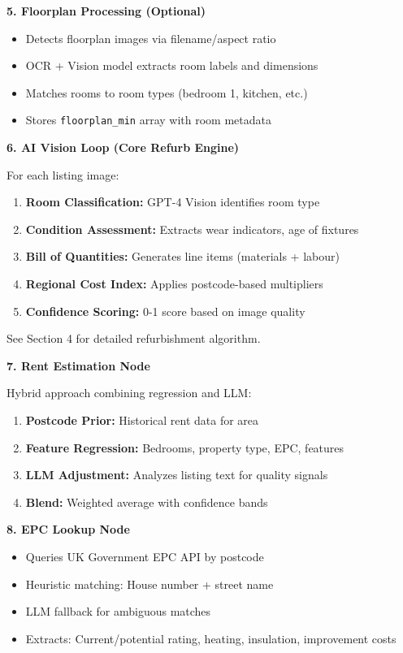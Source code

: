 \documentclass[11pt,a4paper]{article}
\begin{document}
\textbf{5. Floorplan Processing (Optional)}
\begin{itemize}
  \item Detects floorplan images via filename/aspect ratio
  \item OCR + Vision model extracts room labels and dimensions
  \item Matches rooms to room types (bedroom 1, kitchen, etc.)
  \item Stores \texttt{floorplan\_min} array with room metadata
\end{itemize}

\textbf{6. AI Vision Loop (Core Refurb Engine)}

For each listing image:
\begin{enumerate}
  \item \textbf{Room Classification:} GPT-4 Vision identifies room type
  \item \textbf{Condition Assessment:} Extracts wear indicators, age of fixtures
  \item \textbf{Bill of Quantities:} Generates line items (materials + labour)
  \item \textbf{Regional Cost Index:} Applies postcode-based multipliers
  \item \textbf{Confidence Scoring:} 0-1 score based on image quality
\end{enumerate}

See Section 4 for detailed refurbishment algorithm.

\textbf{7. Rent Estimation Node}

Hybrid approach combining regression and LLM:

\begin{enumerate}
  \item \textbf{Postcode Prior:} Historical rent data for area
  \item \textbf{Feature Regression:} Bedrooms, property type, EPC, features
  \item \textbf{LLM Adjustment:} Analyzes listing text for quality signals
  \item \textbf{Blend:} Weighted average with confidence bands
\end{enumerate}

\textbf{8. EPC Lookup Node}
\begin{itemize}
  \item Queries UK Government EPC API by postcode
  \item Heuristic matching: House number + street name
  \item LLM fallback for ambiguous matches
  \item Extracts: Current/potential rating, heating, insulation, improvement costs
\end{itemize}
\end{document}
